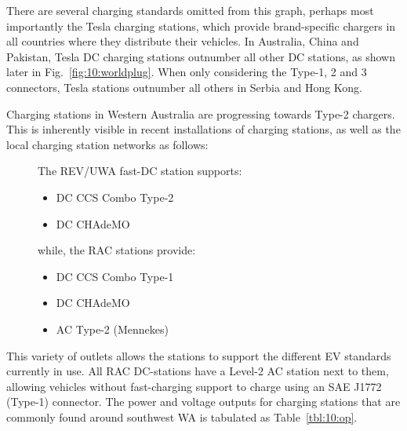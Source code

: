 There are several charging standards omitted from this graph, perhaps most importantly the Tesla charging stations, which provide brand-specific chargers in all countries where they distribute their vehicles. In Australia, China and Pakistan, Tesla DC charging stations outnumber all other DC stations, as shown later in Fig.~\ref{fig:10:worldplug}. When only considering the Type-1, 2 and 3 connectors, Tesla stations outnumber all others in Serbia and Hong Kong.

Charging stations in Western Australia are progressing towards Type-2 chargers. This is inherently visible in recent installations of charging stations, as well as the local charging station networks as follows:

\begin{description}
	\item[] The REV/UWA fast-DC station supports:
	\begin{itemize}
		\item DC CCS Combo Type-2
		\item DC CHAdeMO
	\end{itemize}
	\item[]	while, the RAC stations provide:
	\begin{itemize}
		\item DC CCS Combo Type-1
		\item DC CHAdeMO
		\item AC Type-2 (Mennekes)~\cite{noauthor_ieee_2016}
	\end{itemize}
\end{description}

This variety of outlets allows the stations to support the different EV standards currently in use. All RAC DC-stations have a Level-2 AC station next to them, allowing vehicles without fast-charging support to charge using an SAE J1772 (Type-1) connector. The power and voltage outputs for charging stations that are commonly found around southwest WA is tabulated as Table~\ref{tbl:10:op}.



